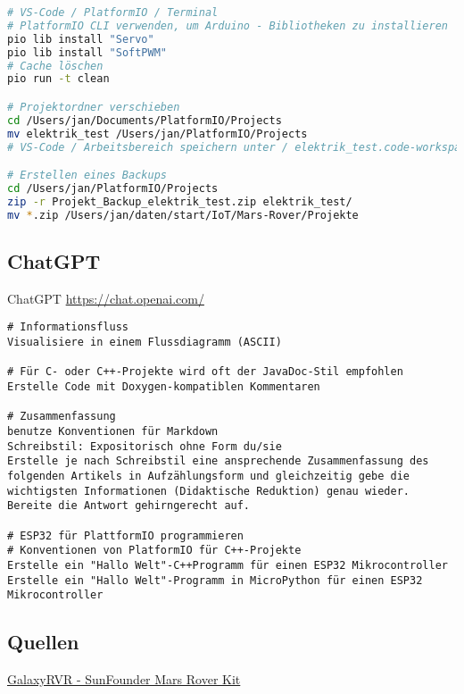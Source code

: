 \documentclass{vorlage-design-main}
\begin{document}
\begin{lstlisting}[language=bash]
# VS-Code / PlatformIO / Terminal
# PlatformIO CLI verwenden, um Arduino - Bibliotheken zu installieren
pio lib install "Servo"
pio lib install "SoftPWM"
# Cache löschen
pio run -t clean

# Projektordner verschieben
cd /Users/jan/Documents/PlatformIO/Projects
mv elektrik_test /Users/jan/PlatformIO/Projects
# VS-Code / Arbeitsbereich speichern unter / elektrik_test.code-workspace + Alias erstellen

# Erstellen eines Backups
cd /Users/jan/PlatformIO/Projects
zip -r Projekt_Backup_elektrik_test.zip elektrik_test/
mv *.zip /Users/jan/daten/start/IoT/Mars-Rover/Projekte
\end{lstlisting}

\hypertarget{chatgpt}{%
\subsection{ChatGPT}\label{chatgpt}}

ChatGPT \url{https://chat.openai.com/}

\begin{lstlisting}
# Informationsfluss
Visualisiere in einem Flussdiagramm (ASCII)

# Für C- oder C++-Projekte wird oft der JavaDoc-Stil empfohlen
Erstelle Code mit Doxygen-kompatiblen Kommentaren

# Zusammenfassung
benutze Konventionen für Markdown
Schreibstil: Expositorisch ohne Form du/sie
Erstelle je nach Schreibstil eine ansprechende Zusammenfassung des folgenden Artikels in Aufzählungsform und gleichzeitig gebe die wichtigsten Informationen (Didaktische Reduktion) genau wieder. Bereite die Antwort gehirngerecht auf.

# ESP32 für PlattformIO programmieren
# Konventionen von PlatformIO für C++-Projekte
Erstelle ein "Hallo Welt"-C++Programm für einen ESP32 Mikrocontroller 
Erstelle ein "Hallo Welt"-Programm in MicroPython für einen ESP32 Mikrocontroller 
\end{lstlisting}

\hypertarget{quellen}{%
\subsection{Quellen}\label{quellen}}

\href{https://docs.sunfounder.com/projects/galaxy-rvr/de/latest/index.html}{GalaxyRVR
- SunFounder Mars Rover Kit}
\end{document}
